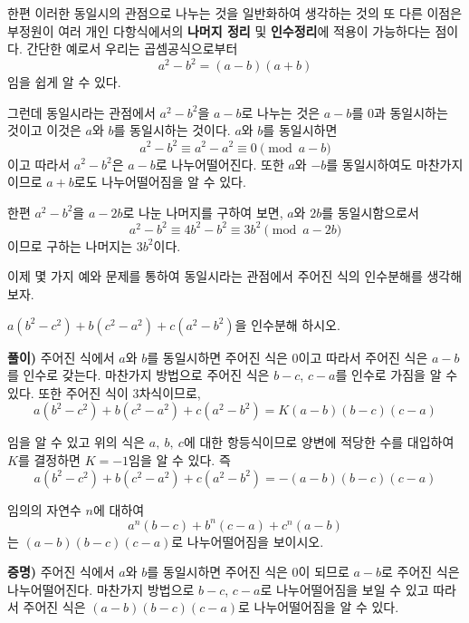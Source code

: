 \documentclass[a4paper]{article}
\begin{document}
  한편 이러한 동일시의 관점으로 나누는 것을 일반화하여 생각하는 것의 또 다른 이점은 부정원이 여러 개인 다항식에서의 \textbf{나머지 정리} 및 \textbf{인수정리}에 적용이 가능하다는 점이다. 간단한 예로서 우리는 곱셈공식으로부터
\[
a^2 - b^2 = (a-b)(a+b)
\]
임을 쉽게 알 수 있다.

  그런데 동일시라는 관점에서 $a^2 -b^2$을 $a-b$로 나누는 것은 $a-b$를 $0$과 동일시하는 것이고 이것은 $a$와 $b$를 동일시하는 것이다. $a$와 $b$를 동일시하면 
  \[
  a^2 -b^2 \equiv a^2 -a^2 \equiv 0  \pmod{a-b}
  \]
  이고 따라서 $a^2 - b^2$은 $a-b$로 나누어떨어진다. 또한 $a$와 $-b$를 동일시하여도 마찬가지 이므로 $a+b$로도 나누어떨어짐을 알 수 있다.

  한편 $a^2 -b^2$을 $a-2b$로 나눈 나머지를 구하여 보면, $a$와 $2b$를 동일시함으로서
  \[
  a^2 - b^2 \equiv 4b^2 - b^2 \equiv 3b^2 \pmod{a-2b}
  \]
이므로 구하는 나머지는 $3b^2$이다.

  이제 몇 가지 예와 문제를 통하여 동일시라는 관점에서 주어진 식의 인수분해를 생각해 보자.
\vspace{1em}

\begin{example}
 $a(b^2 - c^2 ) +b(c^2 -a^2 ) + c(a^2 - b^2 )$을 인수분해 하시오.
\end{example} 

\textbf{풀이)} 주어진 식에서 $a$와 $b$를 동일시하면 주어진 식은 $0$이고 따라서 주어진 식은 $a-b$를 인수로 갖는다. 마찬가지 방법으로 주어진 식은 $b-c$, $c-a$를 인수로 가짐을 알 수 있다. 또한 주어진 식이 $3$차식이므로,
\[
a(b^2 - c^2) + b(c^2 - a^2 ) + c(a^2 - b^2 ) = K(a-b)(b-c)(c-a)
\]

임을 알 수 있고 위의 식은 $a,\:b,\: c$에 대한 항등식이므로 양변에 적당한 수를 대입하여 $K$를 결정하면 $K=-1$임을 알 수 있다. 즉
\[
a(b^2 - c^2) + b(c^2 - a^2 ) + c(a^2 - b^2 ) = - (a-b)(b-c)(c-a)
\]

\vspace{1em}

\begin{theorem}
 임의의 자연수 $n$에 대하여
\[
a^{n}(b-c) + b^{n} (c-a) + c^{n}(a-b)
\]
는 $(a-b)(b-c)(c-a)$로 나누어떨어짐을 보이시오.
\end{theorem}  

\textbf{증명)} 주어진 식에서 $a$와 $b$를 동일시하면 주어진 식은 $0$이 되므로 $a-b$로 주어진 식은 나누어떨어진다. 마찬가지 방법으로 $b-c$, $c-a$로 나누어떨어짐을 보일 수 있고 따라서 주어진 식은 $(a-b)(b-c)(c-a)$로 나누어떨어짐을 알 수 있다.
\end{document}
